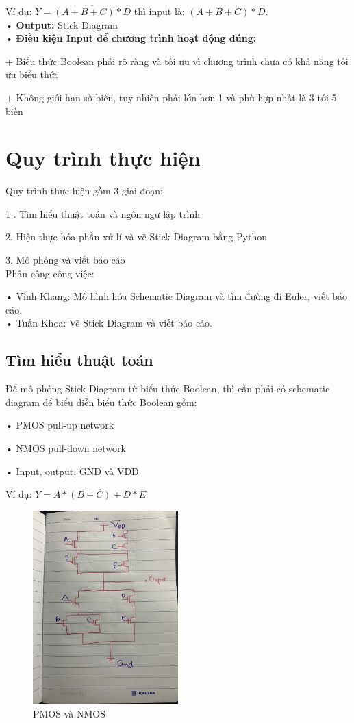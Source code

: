 \documentclass[a4paper,12pt]{article}
\begin{document}
Ví dụ: \( Y = \overline{(A + B + C) * D} \) thì input là: \( (A + B + C) * D \).\\
• \textbf{Output:} Stick Diagram\\
• \textbf{Điều kiện Input để chương trình hoạt động đúng:}

    + Biểu thức Boolean phải rõ ràng và tối ưu vì chương trình chưa có khả năng tối ưu biểu thức

    + Không giới hạn số biến, tuy nhiên phải lớn hơn 1 và phù hợp nhất là 3 tới 5 biến
\newpage
\section{Quy trình thực hiện}
Quy trình thực hiện gồm 3 giai đoạn:

1 . Tìm hiểu thuật toán và ngôn ngữ lập trình

2. Hiện thực hóa phần xử lí và vẽ Stick Diagram bằng Python

3. Mô phỏng và viết báo cáo\\
Phân công công việc:

• Vĩnh Khang: Mô hình hóa Schematic Diagram và tìm đường đi Euler, viết báo cáo.\\
• Tuấn Khoa: Vẽ Stick Diagram và viết báo cáo.
\subsection{Tìm hiểu thuật toán}
Để mô phỏng Stick Diagram từ biểu thức Boolean, thì cần phải có schematic diagram để biểu diễn biểu thức Boolean gồm:

• PMOS pull-up network

• NMOS pull-down network

• Input, output, GND và VDD

Ví dụ: \( Y = \overline{A *(B + C) + D * E} \)

\begin{figure}[H]
    \centering
    \includegraphics[width=0.5\textwidth]{../PNG/ViDuSchematic.jpg}
    \caption{PMOS và NMOS}
    \label{fig:PMOS_NMOS}
\end{figure}
\end{document}
